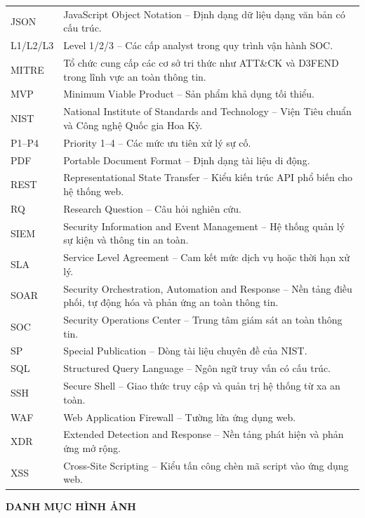 \documentclass[a4paper,12pt,oneside]{book}
\begin{document}
\begin{longtable}{L{3.2cm} L{10.8cm}}
JSON & JavaScript Object Notation -- Định dạng dữ liệu dạng văn bản có cấu trúc. \\
L1/L2/L3 & Level 1/2/3 -- Các cấp analyst trong quy trình vận hành SOC. \\
MITRE & Tổ chức cung cấp các cơ sở tri thức như ATT\&CK và D3FEND trong lĩnh vực an toàn thông tin. \\
MVP & Minimum Viable Product -- Sản phẩm khả dụng tối thiểu. \\
NIST & National Institute of Standards and Technology -- Viện Tiêu chuẩn và Công nghệ Quốc gia Hoa Kỳ. \\
P1--P4 & Priority 1--4 -- Các mức ưu tiên xử lý sự cố. \\
PDF & Portable Document Format -- Định dạng tài liệu di động. \\
REST & Representational State Transfer -- Kiểu kiến trúc API phổ biến cho hệ thống web. \\
RQ & Research Question -- Câu hỏi nghiên cứu. \\
SIEM & Security Information and Event Management -- Hệ thống quản lý sự kiện và thông tin an toàn. \\
SLA & Service Level Agreement -- Cam kết mức dịch vụ hoặc thời hạn xử lý. \\
SOAR & Security Orchestration, Automation and Response -- Nền tảng điều phối, tự động hóa và phản ứng an toàn thông tin. \\
SOC & Security Operations Center -- Trung tâm giám sát an toàn thông tin. \\
SP & Special Publication -- Dòng tài liệu chuyên đề của NIST. \\
SQL & Structured Query Language -- Ngôn ngữ truy vấn có cấu trúc. \\
SSH & Secure Shell -- Giao thức truy cập và quản trị hệ thống từ xa an toàn. \\
WAF & Web Application Firewall -- Tường lửa ứng dụng web. \\
XDR & Extended Detection and Response -- Nền tảng phát hiện và phản ứng mở rộng. \\
XSS & Cross-Site Scripting -- Kiểu tấn công chèn mã script vào ứng dụng web. \\

\end{longtable}

\clearpage

\begin{center}
    {\fontsize{16pt}{20pt}\selectfont\textbf{DANH MỤC HÌNH ẢNH}}
\end{center}
\end{document}

